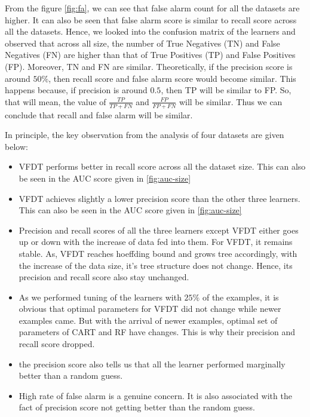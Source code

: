 \documentclass[sigplan]{acmart}\settopmatter{printfolios=true,printccs=false,printacmref=false}
\begin{document}
From the figure \ref{fig:fa}, we can see that false alarm count for all the datasets are higher. It can also be seen that false alarm score is similar to recall score across all the datasets. Hence, we looked into the confusion matrix of the learners and observed that across all size, the number of True Negatives (TN) and False Negatives (FN) are higher than that of True Positives (TP) and False Positives (FP). Moreover, TN and FN are similar. Theoretically, if the precision score is around $50\%$, then recall score and false alarm score would become similar. This happens because, if precision is around $0.5$, then TP will be similar to FP. So, that will mean, the value of $\frac{TP}{TP+FN}$ and $\frac{FP}{FP+FN}$ will be similar. Thus we can conclude that recall and false alarm will be similar. 

In principle, the key observation from the analysis of four datasets are given below: 
\begin{itemize}
	\item VFDT performs better in recall score across all the dataset size. This can also be seen in the AUC score given in \ref{fig:auc-size}
	\item VFDT achieves slightly a lower precision score than the other three learners. This can also be seen in the AUC score given in \ref{fig:auc-size}
	\item Precision and recall scores of all the three learners except VFDT either goes up or down with the increase of data fed into them. For VFDT, it remains stable. As, VFDT reaches hoeffding bound and grows tree accordingly, with the increase of the data size, it's tree structure does not change. Hence, its precision and recall score also stay unchanged.
	\item As we performed tuning of the learners with $25\%$ of the examples, it is obvious that optimal parameters for VFDT did not change while newer examples came. But with the arrival of newer examples, optimal set of parameters of CART and RF have changes. This is why their precision and recall score dropped.  
	\item the precision score also tells us that all the learner performed marginally better than a random guess. 
	\item High rate of false alarm is a genuine concern. It is also associated with the fact of precision score not getting better than the random guess.
\end{itemize}
\end{document}
